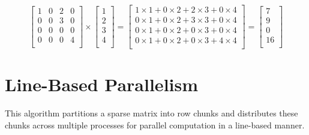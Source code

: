 \documentclass[12pt,oneside]{book} %
\begin{document}
\[
    \begin{bmatrix}
        1 & 0 & 2 & 0 \\
        0 & 0 & 3 & 0 \\
        0 & 0 & 0 & 0 \\
        0 & 0 & 0 & 4 \\
    \end{bmatrix}
    \times
    \begin{bmatrix}
        1 \\
        2 \\
        3 \\
        4 \\
    \end{bmatrix}
    =
    \begin{bmatrix}
        1 \times 1 + 0 \times 2 + 2 \times 3 + 0 \times 4 \\
        0 \times 1 + 0 \times 2 + 3 \times 3 + 0 \times 4 \\
        0 \times 1 + 0 \times 2 + 0 \times 3 + 0 \times 4 \\
        0 \times 1 + 0 \times 2 + 0 \times 3 + 4 \times 4 \\
    \end{bmatrix}
    =
    \begin{bmatrix}
        7  \\
        9  \\
        0  \\
        16 \\
    \end{bmatrix}
\]

\newpage
\section{Line-Based Parallelism}
This algorithm partitions a sparse matrix into row chunks and distributes these
chunks across multiple processes for parallel computation in a line-based
manner.
\end{document}
